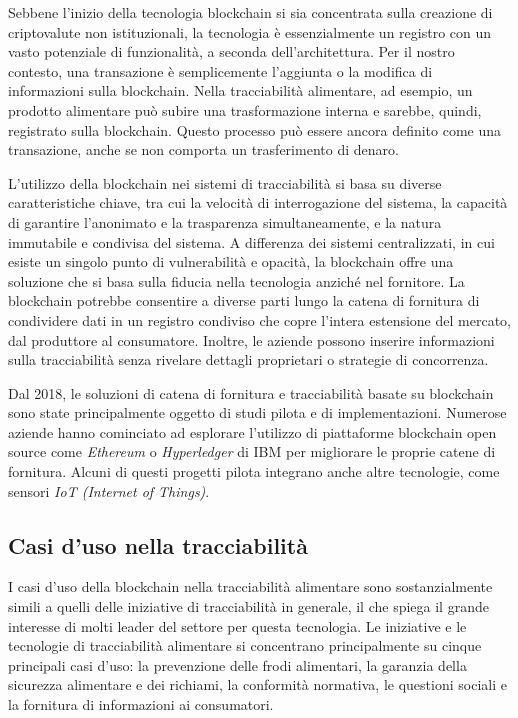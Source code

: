 Sebbene l'inizio della tecnologia blockchain si sia concentrata sulla creazione di criptovalute non istituzionali, la tecnologia è essenzialmente un registro con un vasto potenziale di funzionalità, a seconda dell'architettura. Per il nostro contesto, una transazione è semplicemente l'aggiunta o la modifica di informazioni sulla blockchain. Nella tracciabilità alimentare, ad esempio, un prodotto alimentare può subire una trasformazione interna e sarebbe, quindi, registrato sulla blockchain. Questo processo può essere ancora definito come una transazione, anche se non comporta un trasferimento di denaro.

L'utilizzo della blockchain nei sistemi di tracciabilità si basa su diverse caratteristiche chiave, tra cui la velocità di interrogazione del sistema, la capacità di garantire l'anonimato e la trasparenza simultaneamente, e la natura immutabile e condivisa del sistema. A differenza dei sistemi centralizzati, in cui esiste un singolo punto di vulnerabilità e opacità, la blockchain offre una soluzione che si basa sulla fiducia nella tecnologia anziché nel fornitore. La blockchain potrebbe consentire a diverse parti lungo la catena di fornitura di condividere dati in un registro condiviso che copre l'intera estensione del mercato, dal produttore al consumatore. Inoltre, le aziende possono inserire informazioni sulla tracciabilità senza rivelare dettagli proprietari o strategie di concorrenza.

Dal 2018, le soluzioni di catena di fornitura e tracciabilità basate su blockchain sono state principalmente oggetto di studi pilota e di implementazioni. Numerose aziende hanno cominciato ad esplorare l'utilizzo di piattaforme blockchain open source come \textit{Ethereum} o \textit{Hyperledger} di IBM per migliorare le proprie catene di fornitura. Alcuni di questi progetti pilota integrano anche altre tecnologie, come sensori \textit{IoT (Internet of Things)}.

\subsection{Casi d'uso nella tracciabilità}

I casi d'uso della blockchain nella tracciabilità alimentare sono sostanzialmente simili a quelli delle iniziative di tracciabilità in generale, il che spiega il grande interesse di molti leader del settore per questa tecnologia. Le iniziative e le tecnologie di tracciabilità alimentare si concentrano principalmente su cinque principali casi d'uso: la prevenzione delle frodi alimentari, la garanzia della sicurezza alimentare e dei richiami, la conformità normativa, le questioni sociali e la fornitura di informazioni ai consumatori.

